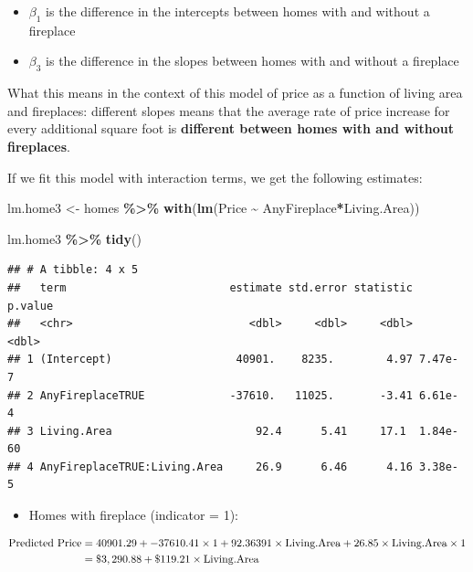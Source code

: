 \documentclass[
]{book}
\newenvironment{Shaded}{\begin{snugshade}}{\end{snugshade}}
\newcommand{\FunctionTok}[1]{\textcolor[rgb]{0.13,0.29,0.53}{\textbf{#1}}}
\newcommand{\NormalTok}[1]{#1}
\newcommand{\OtherTok}[1]{\textcolor[rgb]{0.56,0.35,0.01}{#1}}
\newcommand{\SpecialCharTok}[1]{\textcolor[rgb]{0.81,0.36,0.00}{\textbf{#1}}}
\providecommand{\tightlist}{%
  \setlength{\itemsep}{0pt}\setlength{\parskip}{0pt}}
\begin{document}
\begin{itemize}
\tightlist
\item
  \(\beta_1\) is the difference in the intercepts between homes with and without a fireplace
\item
  \(\beta_3\) is the difference in the slopes between homes with and without a fireplace
\end{itemize}

What this means in the context of this model of price as a function of living area and fireplaces: different slopes means that the average rate of price increase for every additional square foot is \textbf{different between homes with and without fireplaces}.

If we fit this model with interaction terms, we get the following estimates:

\begin{Shaded}
\begin{Highlighting}[]
\NormalTok{lm.home3 }\OtherTok{\textless{}{-}}\NormalTok{ homes }\SpecialCharTok{\%\textgreater{}\%}
  \FunctionTok{with}\NormalTok{(}\FunctionTok{lm}\NormalTok{(Price }\SpecialCharTok{\textasciitilde{}}\NormalTok{ AnyFireplace}\SpecialCharTok{*}\NormalTok{Living.Area))}

\NormalTok{lm.home3 }\SpecialCharTok{\%\textgreater{}\%}
  \FunctionTok{tidy}\NormalTok{()}
\end{Highlighting}
\end{Shaded}

\begin{verbatim}
## # A tibble: 4 x 5
##   term                         estimate std.error statistic  p.value
##   <chr>                           <dbl>     <dbl>     <dbl>    <dbl>
## 1 (Intercept)                   40901.    8235.        4.97 7.47e- 7
## 2 AnyFireplaceTRUE             -37610.   11025.       -3.41 6.61e- 4
## 3 Living.Area                      92.4      5.41     17.1  1.84e-60
## 4 AnyFireplaceTRUE:Living.Area     26.9      6.46      4.16 3.38e- 5
\end{verbatim}

\begin{itemize}
\tightlist
\item
  Homes with fireplace (indicator = 1):
\end{itemize}

\begin{align*}
\hbox{Predicted Price} &= 40901.29 + -37610.41 \times 1 + 92.36391 \times \hbox{Living.Area} + 26.85 \times \hbox{Living.Area} \times 1 \\
& = \$3,290.88 + \$119.21 \times \hbox{Living.Area}
\end{align*}
\end{document}
